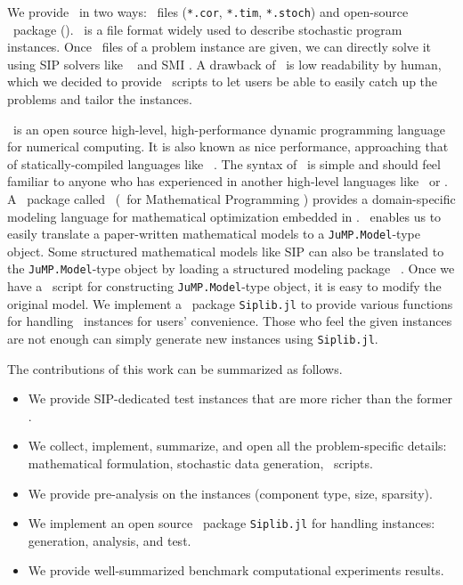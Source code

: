 We provide \siplibtwo\ in two ways: \smps\ files (\texttt{*.cor}, \texttt{*.tim}, \texttt{*.stoch}) and open-source \julia\ package (\siplibjl). \smps\ is a file format widely used to describe stochastic program instances. Once \smps\ files of a problem instance are given, we can directly solve it using SIP solvers like \dsp\ \cite{journal:KZ2015} and \textsf{SMI} \cite{web:SMI}. A drawback of \smps\ is low readability by human, which we decided to provide \julia\ scripts to let users be able to easily catch up the problems and tailor the instances.

\julia\ is an open source high-level, high-performance dynamic programming language for numerical computing. It is also known as nice performance, approaching that of statically-compiled languages like \clang\ \cite{journal:BEKS2017}. The syntax of \julia\ is simple and should feel familiar to anyone who has experienced in another high-level languages like \matlab\ or \python. A \julia\ package called \jump\ (\julia\ for Mathematical Programming \cite{web:JuMP}) provides a domain-specific modeling language for mathematical optimization embedded in \julia. \jump\ enables us to easily translate a paper-written mathematical models to a \texttt{JuMP.Model}-type object. Some structured mathematical models like SIP can also be translated to the \texttt{JuMP.Model}-type object by loading a structured modeling package \structjump\ \cite{web:StructJuMP}. Once we have a \julia\ script for constructing \texttt{JuMP.Model}-type object, it is easy to modify the original model. %
We implement a \julia\ package \texttt{Siplib.jl} to provide various functions for handling \siplibtwo\ instances for users' convenience. Those who feel the given instances are not enough can simply generate new instances using \texttt{Siplib.jl}.

The contributions of this work can be summarized as follows.
\begin{itemize}
	\item We provide SIP-dedicated test instances that are more richer than the former \siplib.
	\item We collect, implement, summarize, and open all the problem-specific details: mathematical formulation, stochastic data generation, \julia\ scripts.
	\item We provide pre-analysis on the instances (component type, size, sparsity).
	\item We implement an open source \julia\ package \texttt{Siplib.jl} for handling instances: generation, analysis, and test.
	\item We provide well-summarized benchmark computational experiments results.
\end{itemize}

